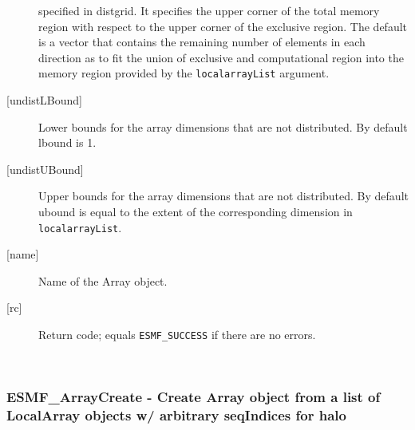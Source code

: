 \begin{description}
   specified in distgrid. It specifies the upper corner of the total memory
   region with respect to the upper corner of the exclusive region.
   The default is a vector that contains the remaining number of elements
   in each direction as to fit the union of exclusive and computational
   region into the memory region provided by the {\tt localarrayList} argument.
   \item[{[undistLBound]}]
   Lower bounds for the array dimensions that are not distributed.
   By default lbound is 1.
   \item[{[undistUBound]}]
   Upper bounds for the array dimensions that are not distributed.
   By default ubound is equal to the extent of the corresponding
   dimension in {\tt localarrayList}.
   \item[{[name]}]
   Name of the Array object.
   \item[{[rc]}]
   Return code; equals {\tt ESMF\_SUCCESS} if there are no errors.
   \end{description}
   
 
\mbox{}\hrulefill\ 
 
\subsubsection [ESMF\_ArrayCreate] {ESMF\_ArrayCreate - Create Array object from a list of LocalArray objects w/ arbitrary seqIndices for halo}


